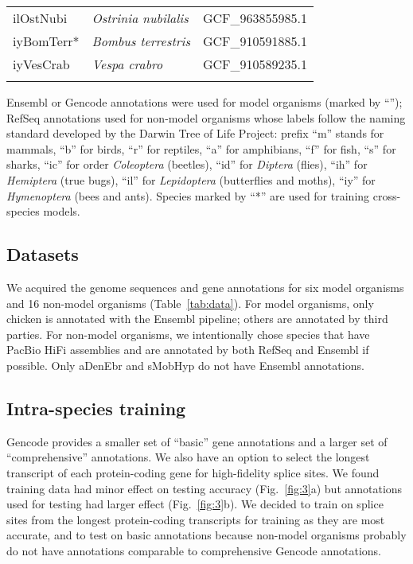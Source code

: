 \documentclass[webpdf,contemporary,large,namedate]{oup-authoring-template}%
\begin{document}
\begin{table}[!tb]
\begin{tabular*}{\columnwidth}{@{\extracolsep\fill}lll@{\extracolsep\fill}}
ilOstNubi      & \emph{Ostrinia nubilalis}         & GCF\_963855985.1 \\
iyBomTerr*     & \emph{Bombus terrestris}          & GCF\_910591885.1 \\
iyVesCrab      & \emph{Vespa crabro}               & GCF\_910589235.1 \\
\botrule
\end{tabular*}
\begin{tablenotes}\setlength\itemsep{0.0em}
Ensembl or Gencode annotations were used for model organisms (marked by ``\dag'');
RefSeq annotations used for non-model organisms whose labels
follow the naming standard developed by the Darwin Tree of Life Project:
prefix ``m'' stands for mammals,
``b'' for birds,
``r'' for reptiles,
``a'' for amphibians,
``f'' for fish,
``s'' for sharks,
``ic'' for order \emph{Coleoptera} (beetles),
``id'' for \emph{Diptera} (flies),
``ih'' for \emph{Hemiptera} (true bugs),
``il'' for \emph{Lepidoptera} (butterflies and moths),
``iy'' for \emph{Hymenoptera} (bees and ants).
Species marked by ``*'' are used for training cross-species models.
\end{tablenotes}
\end{table}

\subsection{Datasets}

We acquired the genome sequences and gene annotations for six model organisms and 16 non-model organisms (Table~\ref{tab:data}).
For model organisms, only chicken is annotated with the Ensembl pipeline;
others are annotated by third parties.
For non-model organisms, we intentionally chose species that have PacBio HiFi assemblies
and are annotated by both RefSeq and Ensembl if possible.
Only aDenEbr and sMobHyp do not have Ensembl annotations.

\subsection{Intra-species training}

Gencode provides a smaller set of ``basic'' gene annotations and a larger set of ``comprehensive'' annotations.
We also have an option to select the longest transcript of each protein-coding gene for high-fidelity splice sites.
We found training data had minor effect on testing accuracy (Fig.~\ref{fig:3}a)
but annotations used for testing had larger effect (Fig.~\ref{fig:3}b).
We decided to train on splice sites from the longest protein-coding transcripts for training as they are most accurate,
and to test on basic annotations because non-model organisms probably do not have annotations comparable to comprehensive Gencode annotations.
\end{document}
